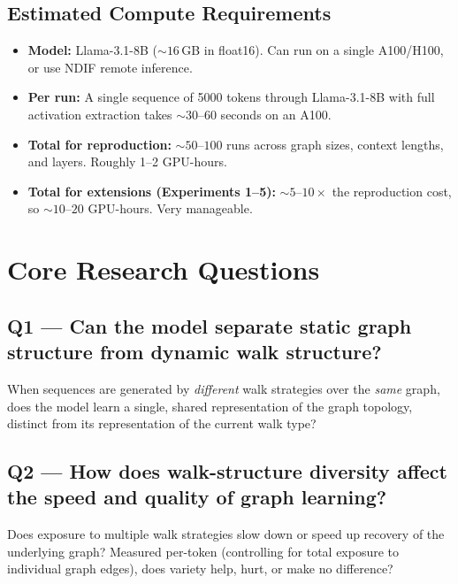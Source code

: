 \documentclass[11pt]{article}
\begin{document}
\subsection{Estimated Compute Requirements}

\begin{itemize}
    \item \textbf{Model:} Llama-3.1-8B (${\sim}16$\,GB in float16). Can run on a single A100/H100, or use NDIF remote inference.
    \item \textbf{Per run:} A single sequence of 5000 tokens through Llama-3.1-8B with full activation extraction takes ${\sim}30$--$60$ seconds on an A100.
    \item \textbf{Total for reproduction:} ${\sim}50$--$100$ runs across graph sizes, context lengths, and layers. Roughly 1--2 GPU-hours.
    \item \textbf{Total for extensions (Experiments 1--5):} ${\sim}5$--$10\times$ the reproduction cost, so ${\sim}10$--$20$ GPU-hours. Very manageable.
\end{itemize}

\section{Core Research Questions}
\label{sec:questions}

\subsection{Q1 --- Can the model separate static graph structure from dynamic walk structure?}

When sequences are generated by \emph{different} walk strategies over the \emph{same} graph, does the model learn a single, shared representation of the graph topology, distinct from its representation of the current walk type?

\subsection{Q2 --- How does walk-structure diversity affect the speed and quality of graph learning?}

Does exposure to multiple walk strategies slow down or speed up recovery of the underlying graph? Measured per-token (controlling for total exposure to individual graph edges), does variety help, hurt, or make no difference?
\end{document}

